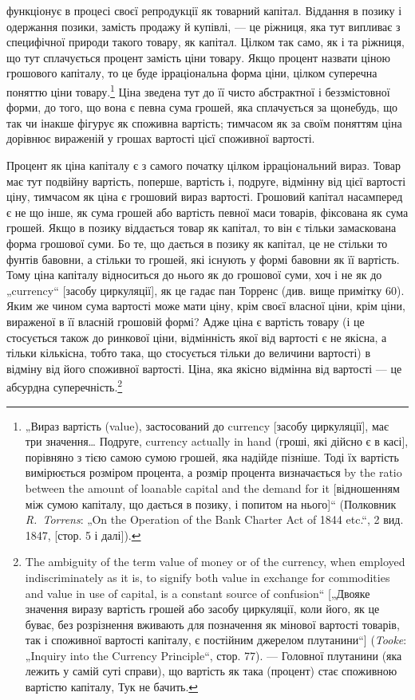 \parcont{}  %
функціонує в процесі своєї репродукції як товарний капітал.
Віддання в позику і одержання позики, замість продажу й купівлі,
— це ріжниця, яка тут випливає з специфічної природи
такого товару, як капітал. Цілком так само, як і та ріжниця, що
тут сплачується процент замість ціни товару. Якщо процент
назвати ціною грошового капіталу, то це буде ірраціональна
форма ціни, цілком суперечна поняттю ціни товару.\footnote{„Вираз вартість (value), застосований до currency [засобу циркуляції], має
три значення\dots{} Подруге, currency actually in hand (гроші, які дійсно є в касі],
порівняно з тією самою сумою грошей, яка надійде пізніше. Тоді їх вартість
вимірюється розміром процента, а розмір процента визначається by the ratio
between the amount of loanable capital and the demand for it [відношенням між
сумою капіталу, що дається в позику, і попитом на нього]“ (Полковник
\emph{R.~Torrens}: „On the Operation of the Bank Charter Act of 1844 etc.“, 2 вид. 1847,
[стор. 5 і далі]).} Ціна зведена
тут до її чисто абстрактної і беззмістовної форми, до того,
що вона є певна сума грошей, яка сплачується за щонебудь, що
так чи інакше фігурує як споживна вартість; тимчасом як за
своїм поняттям ціна дорівнює вираженій у грошах вартості цієї
споживної вартості.

Процент як ціна капіталу є з самого початку цілком ірраціональний
вираз. Товар має тут подвійну вартість, поперше, вартість
і, подруге, відмінну від цієї вартості ціну, тимчасом як ціна
є грошовий вираз вартості. Грошовий капітал насамперед є не
що інше, як сума грошей або вартість певної маси товарів, фіксована
як сума грошей. Якщо в позику віддається товар як
капітал, то він є тільки замаскована форма грошової суми. Бо
те, що дається в позику як капітал, це не стільки то фунтів
бавовни, а стільки то грошей, які існують у формі бавовни як
її вартість. Тому ціна капіталу відноситься до нього як до грошової
суми, хоч і не як до „currency“ [засобу циркуляції], як
це гадає пан Торренс (див. вище примітку 60). Яким же чином
сума вартості може мати ціну, крім своєї власної ціни, крім
ціни, вираженої в її власній грошовій формі? Адже ціна є вартість
товару (і це стосується також до ринкової ціни, відмінність
якої від вартості є не якісна, а тільки кількісна, тобто така, що
стосується тільки до величини вартості) в відміну від його
споживної вартості. Ціна, яка якісно відмінна від вартості —
це абсурдна суперечність.\footnote{
The ambiguity of the term value of money or of the currency, when employed
indiscriminately as it is, to signify both value in exchange for commodities
and value in use of capital, is a constant source of confusion“ [„Двояке значення
виразу вартість грошей або засобу циркуляції, коли його, як це буває, без
розрізнення вживають для позначення як мінової вартості товарів, так і споживної
вартості капіталу, є постійним джерелом плутанини“] (\emph{Tooke}: „Inquiry
into the Currency Principle“, стор. 77). — Головної плутанини (яка лежить у самій
суті справи), що вартість як така (процент) стає споживною вартістю капіталу,
Тук не бачить.
}

